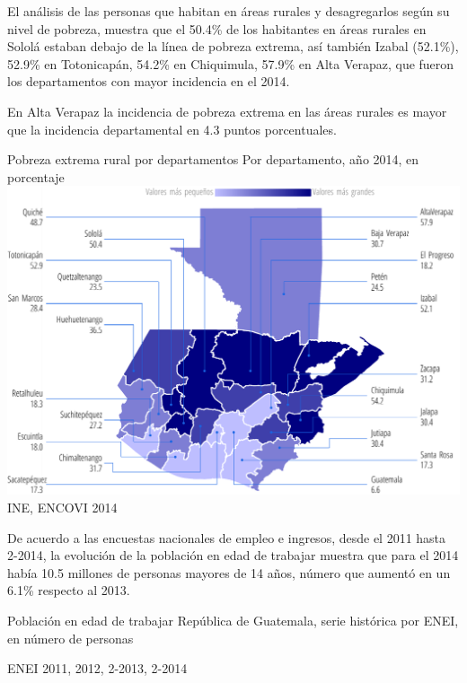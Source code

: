                      
                     {%
                     	El análisis de las personas que habitan en áreas rurales y desagregarlos según su nivel de pobreza, muestra que el 50.4\% de los habitantes en áreas rurales en Sololá estaban debajo de la línea de pobreza extrema, así también Izabal (52.1\%), 52.9\% en Totonicapán, 54.2\% en Chiquimula, 57.9\% en Alta Verapaz, que fueron los departamentos con mayor incidencia en el 2014.
                     	
                     	En Alta Verapaz la incidencia de pobreza extrema en las áreas rurales es mayor que la incidencia departamental en 4.3 puntos porcentuales.}%
                     {%
                     	Pobreza extrema rural por departamentos
                     } %
                     {%
                     	Por departamento, año 2014, en porcentaje} %
                     {%
                     	\includegraphics[width=52\cuadri]{graficas/1_16.pdf}}%
                     {%
                     	INE, ENCOVI 2014} %
         
 
 {%
 De acuerdo a las encuestas nacionales de empleo e ingresos, desde el 2011 hasta 2-2014\llamada, la evolución de la población en edad de trabajar muestra que para el 2014 había 10.5 millones de personas mayores de 14 años, número que aumentó en un 6.1\% respecto al 2013.
 
 }%
 {%
 	Población en edad de trabajar} %
 {%
 	República de Guatemala, serie histórica por ENEI, en número de personas} %
 {%
 	\begin{tikzpicture}[x=1pt,y=1pt]    \end{tikzpicture}}%
 {%
 	ENEI 2011, 2012, 2-2013, 2-2014} %
 
